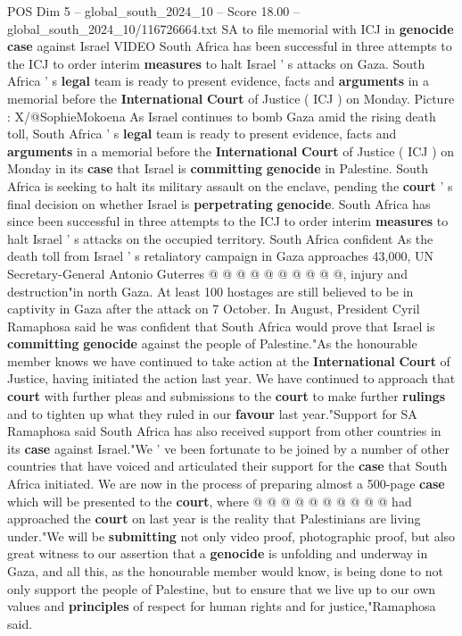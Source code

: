 \begin{textsample}{POS Dim 5 – global\_south\_2024\_10 – Score 18.00 – global\_south\_2024\_10/116726664.txt}  \label{ex:f5_pos_344}
SA to file memorial with ICJ in \textbf{genocide} \textbf{case} against Israel VIDEO South Africa has been successful in three attempts to the ICJ to order interim \textbf{measures} to halt Israel ' s attacks on Gaza.
South Africa ' s \textbf{legal} team is ready to present evidence, facts and \textbf{arguments} in a memorial before the \textbf{International} \textbf{Court} of Justice ( ICJ ) on Monday.
Picture : X/@SophieMokoena As Israel continues to bomb Gaza amid the rising death toll, South Africa ' s \textbf{legal} team is ready to present evidence, facts and \textbf{arguments} in a memorial before the \textbf{International} \textbf{Court} of Justice ( ICJ ) on Monday in its \textbf{case} that Israel is \textbf{committing} \textbf{genocide} in Palestine.
South Africa is seeking to halt its military assault on the enclave, pending the \textbf{court} ' s final decision on whether Israel is \textbf{perpetrating} \textbf{genocide}.
South Africa has since been successful in three attempts to the ICJ to order interim \textbf{measures} to halt Israel ' s attacks on the occupied territory.
South Africa confident As the death toll from Israel ' s retaliatory campaign in Gaza approaches 43,000, UN Secretary-General Antonio Guterres @ @ @ @ @ @ @ @ @ @, injury and destruction"in north Gaza.
At least 100 hostages are still believed to be in captivity in Gaza after the attack on 7 October.
In August, President Cyril Ramaphosa said he was confident that South Africa would prove that Israel is \textbf{committing} \textbf{genocide} against the people of Palestine."As the honourable member knows we have continued to take action at the \textbf{International} \textbf{Court} of Justice, having initiated the action last year.
We have continued to approach that \textbf{court} with further pleas and submissions to the \textbf{court} to make further \textbf{rulings} and to tighten up what they ruled in our \textbf{favour} last year."Support for SA Ramaphosa said South Africa has also received support from other countries in its \textbf{case} against Israel."We ' ve been fortunate to be joined by a number of other countries that have voiced and articulated their support for the \textbf{case} that South Africa initiated.
We are now in the process of preparing almost a 500-page \textbf{case} which will be presented to the \textbf{court}, where @ @ @ @ @ @ @ @ @ @ had approached the \textbf{court} on last year is the reality that Palestinians are living under."We will be \textbf{submitting} not only video proof, photographic proof, but also great witness to our assertion that a \textbf{genocide} is unfolding and underway in Gaza, and all this, as the honourable member would know, is being done to not only support the people of Palestine, but to ensure that we live up to our own values and \textbf{principles} of respect for human rights and for justice,"Ramaphosa said.

\end{textsample}

